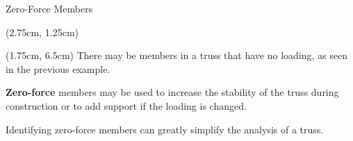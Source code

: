 \documentclass[9pt, xcolor={svgnames, x11names},professionalfonts]{beamer}
\def\scale{1}
\begin{document}
\begin{frame}{Zero-Force Members}
	\begin{textblock*}{0.7\textwidth}(2.75cm, 1.25cm)
		\begin{statsbox}{}{}
			\centering
			\small
			\def\scale{0.55}
			
		\end{statsbox}
	\end{textblock*}

	\begin{textblock*}{0.9\textwidth}(1.75cm, 6.5cm)
		There may be members in a truss that have no loading, as seen in the previous example.\par
		\textbf{Zero-force} members may be used to increase the stability of the truss during construction or to add support
		if the loading is changed.\par
		Identifying zero-force members can greatly simplify the analysis of a truss.
	\end{textblock*}
\end{frame}

\end{document}
